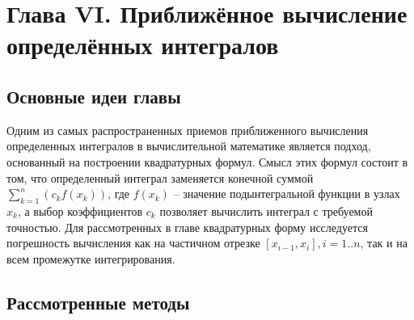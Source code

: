 \newpage
{}
\pagestyle{empty}
\vspace{0.5cm}

\section*{Глава VI. Приближённое вычисление определённых интегралов}

\subsection{Основные идеи главы} 
Одним из самых распространенных приемов приближенного вычисления определенных интегралов в вычислительной математике является подход, основанный на построении квадратурных формул. Смысл этих формул состоит в том, что определенный интеграл заменяется конечной суммой $\sum_{k=1}^{n}(c_k f(x_k))$, где $f(x_k)$ -- значение подынтегральной функции в узлах $x_k$, а выбор коэффициентов $c_k$ позволяет вычислить интеграл с требуемой точностью. Для рассмотренных в главе квадратурных форму исследуется погрешность вычисления как на частичном отрезке $[x_{i-1}, x_i], i = 1..n$, так и на всем промежутке интегрирования.

\subsection{Рассмотренные методы}
